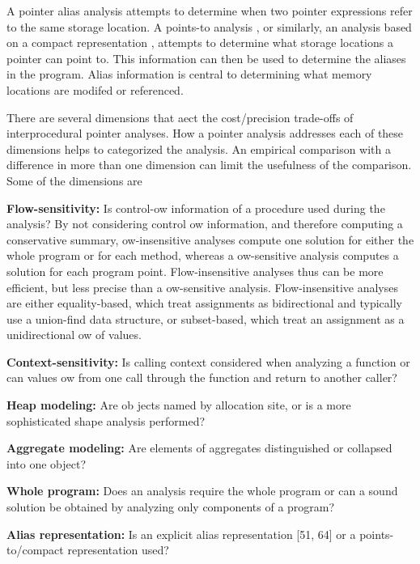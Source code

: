 A pointer alias analysis attempts to determine when two pointer expressions refer to the same storage location. A
points-to analysis , or similarly, an analysis based
on a compact representation , attempts to determine what storage locations a pointer can point to. This
information can then be used to determine the aliases in the program. Alias information is central to determining what
memory locations are modifed or referenced.

There are several dimensions that aect the cost/precision
trade-offs of interprocedural pointer analyses. How a pointer
analysis addresses each of these dimensions helps to categorized the analysis. An empirical comparison with a 
difference in more than one dimension can limit the usefulness of
the comparison. Some of the dimensions are

\textbf{ Flow-sensitivity:} Is control-ow information of a procedure used during the analysis? By not considering control
ow information, and therefore computing a conservative
summary, ow-insensitive analyses compute one solution for
either the whole program or for each method, whereas a ow-sensitive analysis computes a solution for each program point. 
Flow-insensitive analyses thus can be more efficient, but less precise than a ow-sensitive analysis. Flow-insensitive analyses
are either equality-based, which treat assignments as bidirectional and typically use a union-find data structure, 
or subset-based, which treat an assignment as
a unidirectional ow of values.

\textbf{ Context-sensitivity:} Is calling context considered when
analyzing a function or can values ow from one call through
the function and return to another caller?

\textbf{ Heap modeling:} Are ob jects named by allocation site,
or is a more sophisticated shape analysis performed?

\textbf{ Aggregate modeling:} Are elements of aggregates distinguished or collapsed into one object?

\textbf{ Whole program:} Does an analysis require the whole
program or can a sound solution be obtained by analyzing
only components of a program?

\textbf{ Alias representation:} Is an explicit alias representation [51, 64] or a points-to/compact representation used?


